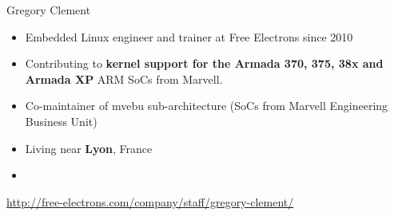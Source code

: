 \begin{frame}{Gregory Clement}
    \begin{itemize}
	\item Embedded Linux engineer and trainer at Free Electrons since 2010
	\item Contributing to {\bf kernel support for the Armada 370, 375, 38x and
	      Armada XP} ARM SoCs from Marvell.
	\item Co-maintainer of mvebu sub-architecture (SoCs from Marvell
    	      Engineering Business Unit)
	\item Living near {\bf Lyon}, France
	\item {}
    \end{itemize}
    {\small \url{http://free-electrons.com/company/staff/gregory-clement/}}
\end{frame}
